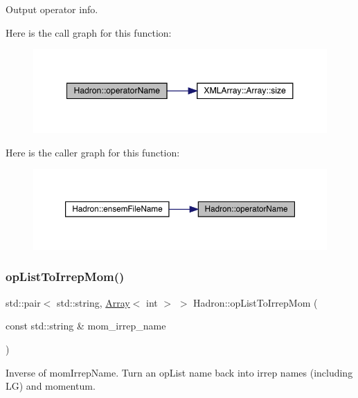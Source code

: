 Output operator info. 

Here is the call graph for this function\+:
\nopagebreak
\begin{figure}[H]
\begin{center}
\leavevmode
\includegraphics[width=348pt]{d1/daf/namespaceHadron_a8f8a77c02a6415ffc31d2a300f59e6a6_cgraph}
\end{center}
\end{figure}
Here is the caller graph for this function\+:
\nopagebreak
\begin{figure}[H]
\begin{center}
\leavevmode
\includegraphics[width=350pt]{d1/daf/namespaceHadron_a8f8a77c02a6415ffc31d2a300f59e6a6_icgraph}
\end{center}
\end{figure}
\mbox{\label{namespaceHadron_a8bd515c92e3dbbe8e9741b25d71edc60}} 
\subsubsection{\texorpdfstring{opListToIrrepMom()}{opListToIrrepMom()}}
{\footnotesize\ttfamily std\+::pair$<$ std\+::string, \mbox{\hyperlink{classXMLArray_1_1Array}{Array}}$<$ int $>$ $>$ Hadron\+::op\+List\+To\+Irrep\+Mom (\begin{DoxyParamCaption}\item[{const std\+::string \&}]{mom\+\_\+irrep\+\_\+name }\end{DoxyParamCaption})}



Inverse of mom\+Irrep\+Name. Turn an op\+List name back into irrep names (including LG) and momentum. 

